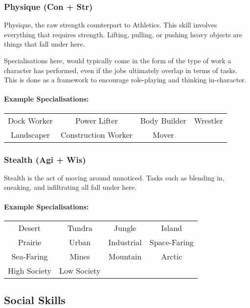\subsubsection{Physique (Con + Str)}
Physique, the raw strength counterpart to Athletics. 
This skill involves everything that requires strength.
Lifting, pulling, or pushing heavy objects are things that fall under here.

Specialisations here, would typically come in the form of the type of work a character has performed, even if the jobs ultimately overlap in terms of tasks.
This is done as a framework to encourage role-playing and thinking in-character.

\paragraph{Example Specialisations:}
\begin{center}
    \begin{tabular}{c|c|c|c}
        Dock Worker & Power Lifter & Body Builder & Wrestler \\
        Landscaper & Construction Worker & Mover
    \end{tabular}
\end{center}

\subsubsection{Stealth (Agi + Wis)}
Stealth is the act of moving around unnoticed.
Tasks such as blending in, sneaking, and infiltrating all fall under here.

\paragraph{Example Specialisations:}
\begin{center}
    \begin{tabular}{c|c|c|c}
        Desert & Tundra & Jungle & Island \\
        Prairie & Urban & Industrial & Space-Faring \\
        Sea-Faring & Mines & Mountain & Arctic \\
        High Society & Low Society \\
    \end{tabular}
\end{center}

\subsection{Social Skills}
